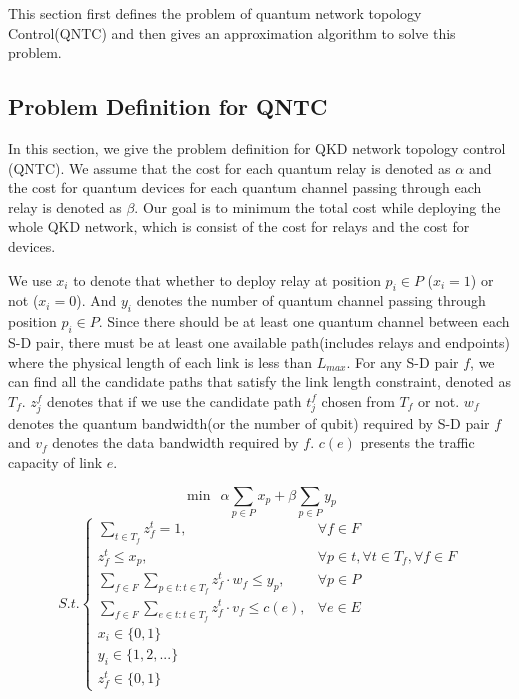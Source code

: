 This section first defines the problem of quantum network topology Control(QNTC) and then gives an approximation algorithm to solve this problem.

\subsection{Problem Definition for QNTC}
In this section, we give the problem definition for QKD network topology control (QNTC). We assume that the cost for each quantum relay is denoted as $\alpha$ and the cost for quantum devices for each quantum channel passing through each relay is denoted as $\beta$. Our goal is to minimum the total cost while deploying the whole QKD network, which is consist of the cost for relays and the cost for devices.

 We use $x_i$ to denote that whether to deploy relay at position $p_i \in P$ ($x_i = 1 $) or not ($x_i = 0$). And $y_i$ denotes the number of quantum channel passing through position $p_i \in P$. Since there should be at least one quantum channel between each S-D pair, there must be at least one available path(includes relays and endpoints) where the physical length of each link is less than $L_{max}$. For any S-D pair $f$, we can find all the candidate paths that satisfy the link length constraint, denoted as $T_f$. $z_j^f$ denotes that if we use the candidate path $t_j^f$ chosen from $T_f$ or not. $w_f$ denotes the quantum bandwidth(or the number of qubit) required by S-D pair $f$ and $v_f$ denotes the data bandwidth required by $f$. $c(e)$ presents the traffic capacity of link $e$.

{\small
	\begin{equation*}
	\min \ \  \alpha\sum_{p \in P}{x_p} + \beta\sum_{p \in P}{y_p}
	\end{equation*}
	\begin{equation}\label{eq:int}
	{S.t.}\begin{cases}
     \sum_{t \in T_f}{z_f^t} = 1, & \forall f \in F \\
     z_f^t \le x_p, & \forall p \in t, \forall t \in T_f, \forall f \in F \\
     \sum_{f \in F}\sum_{p \in t:t \in T_f}{z_f^t \cdot w_f} \le  y_p, & \forall p \in P \\
     \sum_{f \in F}\sum_{e \in t:t \in T_f}{z_f^t \cdot v_f} \le c(e), & \forall e \in E \\
	 x_i \in \{0, 1\}\\
     y_i \in \{1,2,...\}\\
     z_f^t \in \{0,1\}

	\end{cases}
	\end{equation}
}


